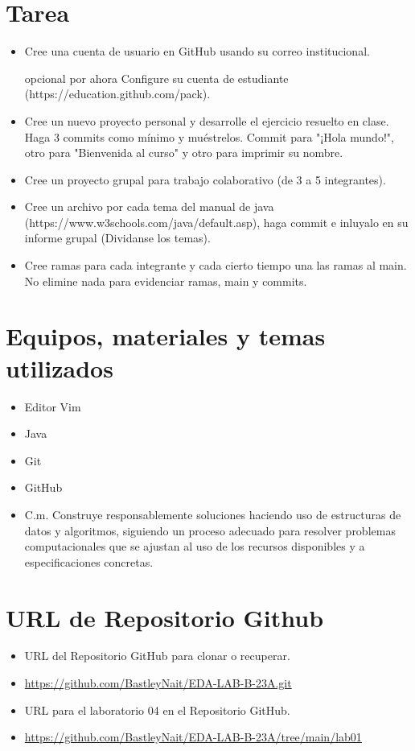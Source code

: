 \documentclass{article}
\begin{document}
	\section{Tarea}
	\begin{itemize}		
		\item Cree una cuenta de usuario en GitHub usando su correo institucional.
		\item [opcional por ahora] Configure su cuenta de estudiante (https://education.github.com/pack).
		\item Cree un nuevo proyecto personal y desarrolle el ejercicio resuelto en clase. Haga 3 commits como mínimo y muéstrelos. Commit para "¡Hola mundo!", otro para "Bienvenida al curso" y otro para imprimir su nombre.
		\item Cree un proyecto grupal para trabajo colaborativo (de 3 a 5 integrantes).
		\item Cree un archivo por cada tema del manual de java (https://www.w3schools.com/java/default.asp), haga commit e inluyalo en su informe grupal (Dividanse los temas).
		\item Cree ramas para cada integrante y cada cierto tiempo una las ramas al main. No elimine nada para evidenciar ramas, main y commits.

		
	\end{itemize}
		
	\section{Equipos, materiales y temas utilizados}
	\begin{itemize}
		\item Editor Vim
		\item Java
		\item Git
		\item GitHub
		\item C.m. Construye responsablemente soluciones haciendo uso de estructuras de datos y algoritmos, siguiendo un proceso adecuado para resolver problemas computacionales que se ajustan al uso de los recursos disponibles y a especificaciones concretas.
		
	\end{itemize}
	
	\section{URL de Repositorio Github}
	\begin{itemize}
		\item URL del Repositorio GitHub para clonar o recuperar.
		\item \url{https://github.com/BastleyNait/EDA-LAB-B-23A.git}
		\item URL para el laboratorio 04 en el Repositorio GitHub.
		\item \url{https://github.com/BastleyNait/EDA-LAB-B-23A/tree/main/lab01}
	\end{itemize}
	
\end{document}
